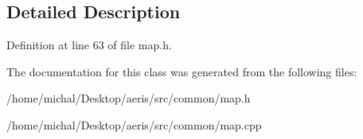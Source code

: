\subsection{Detailed Description}


Definition at line 63 of file map.\-h.



The documentation for this class was generated from the following files\-:\begin{DoxyCompactItemize}
\item 
/home/michal/\-Desktop/aeris/src/common/map.\-h\item 
/home/michal/\-Desktop/aeris/src/common/map.\-cpp\end{DoxyCompactItemize}
